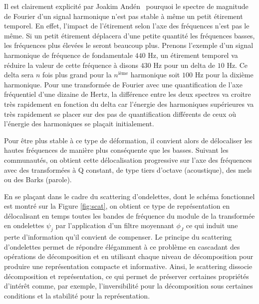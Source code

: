 Il est clairement explicité par Joakim And\'en~\cite{anden2014deep} pourquoi le spectre de magnitude de Fourier d'un signal harmonique n'est pas stable à même un petit étirement temporel. En effet, l'impact de l'étirement selon l'axe des fréquences n'est pas le même. Si un petit étirement déplacera d'une petite quantité les fréquences basses, les fréquences plus élevées le seront beaucoup plus. Prenons l'exemple d'un signal harmonique de fréquence de fondamentale $440$ Hz, un étirement temporel va réduire la valeur de cette fréquence à disons $430$ Hz pour un delta de $10$ Hz. Ce delta sera $n$ fois plus grand pour la $n^{\text{ième}}$ harmonique soit $100$ Hz pour la dixième harmonique. Pour une transformée de Fourier avec une quantification de l'axe fréquentiel d'une dizaine de Hertz, la différence entre les deux spectres va croitre très rapidement en fonction du delta car l'énergie des harmoniques supérieures va très rapidement se placer sur des pas de quantification différents de ceux où l'énergie des harmoniques se plaçait initialement.

Pour être plus stable à ce type de déformation, il convient alors de \og délocaliser \fg les hautes fréquences de manière plus conséquente que les basses. Suivant les communautés, on obtient cette délocalisation progressive sur l'axe des fréquences avec des transformées à Q constant, de type tiers d'octave (acoustique), des mels ou des Barks (parole).

En se plaçant dans le cadre du scattering d'ondelettes, dont le schéma fonctionnel est montré sur la Figure \ref{fig:scat}, on obtient ce type de représentation en délocalisant en temps toutes les bandes de fréquence du module de la transformée en ondelettes $\psi_j$ par l'application d'un filtre moyennant $\phi_J$ ce qui induit une perte d'information qu'il convient de compenser. Le principe du scattering d'ondelettes permet de répondre élégamment à ce problème en cascadant des opérations de décomposition et en utilisant chaque niveau de décomposition pour produire une représentation compacte et informative. Ainsi, le scattering dissocie décomposition et représentation, ce qui permet de préserver certaines propriétés d'intérêt comme, par exemple, l'inversibilité pour la décomposition sous certaines conditions et la stabilité pour la représentation.

